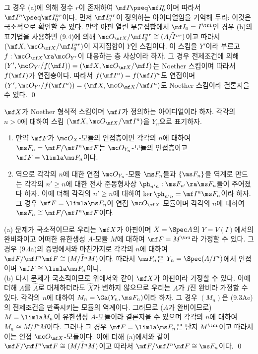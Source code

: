\begin{proposition}
	그 경우 (a)에 의해 정수 $r$이 존재하여 $\mf I\pseq\mf I_0^r$이며 따라서 $\mf I^n\pseq\mf I_0^{nr}$이다.
	먼저 $\mf I_0^{nr}$이 정의하는 아이디얼임을 기억해 두라: 이것은 국소적으로 확인할 수 있다.
	만약 아핀 열린 부분집합에서 $\mf I_0=I^\tri$인 경우 (b)의 표기법을 사용하면
	(9.4)에 의해 $\mc O_{\mf X}/\mf I_0^{nr}\cong\tilde{(A/I^{nr})}$이고
	따라서 $(\mf X,\mc O_{\mf X}/\mf I_0^{nr})$이 지지집합이 $Y$인 스킴이다.
	이 스킴을 $Y'$이라 부르고 $f:\mc O_{\mf X}\ra\mc O_{Y'}$이 대응하는 층 사상이라 하자.
	그 경우 전제조건에 의해 $(Y',\mc O_{Y'}/f(\mf I))=(\mf X,\mc O_{\mf X}/\mf I)$는 Noether 스킴이며 따라서 $f(\mf I)$가 연접층이다.
	따라서 $f(\mf I^n)=f(\mf I)^n$도 연접이며
	$(Y',\mc O_{Y'}/f(\mf I^n))=(\mf X,\mc O_{\mf X}/\mf I^n)$도 Noether 스킴이라 결론지을 수 있다.
	\qed
	\end{proposition}
	
	
	\begin{proposition}
	$\mf X$가 Noether 형식적 스킴이며 $\mf I$가 정의하는 아이디얼이라 하자.
	각각의 $n>0$에 대하여 스킴 $(\mf X,\mc O_{\mf X}/\mf I^n)$을 $Y_n$으로 표기하자.
	\begin{enumerate}[label=(\alph*)]
	\item 만약 $\mf F$가 $\mc O_X$-모듈의 연접층이면 각각의 $n$에 대하여 $\ms F_n=\mf F/\mf I^n\mf F$는
	$\mc O_{Y_n}$-모듈의 연접층이고 $\mf F=\limla\ms F_n$이다.
	\item 역으로 각각의 $n$에 대한 연접 $\mc O_{Y_n}$-모듈 $\ms F_n$들과
	$\{\ms F_n\}$을 역계로 만드는 각각의 $n'\ge n$에 대한 전사 준동형사상 $\ph_{n'n}:\ms F_{n'}\ra\ms F_n$들이 주어졌다 하자.
	이에 더해 각각의 $n'\ge n$에 대하여 $\ker\ph_{n'n}=\mf I^n\ms F_n$이라 하자.
	그 경우 $\mf F=\limla\ms F_n$이 연접 $\mc O_{\mf X}$-모듈이며 각각의 $n$에 대하여 $\ms F_n\cong\mf F/\mf I^n\mf F$이다.\\
	\end{enumerate}
	\pf (a) 문제가 국소적이므로 우리는 $\mf X$가 아핀이며 $X=\Spec A$의 $Y=V(I)$에서의 완비화이고
	어떠한 유한생성 $A$-모듈 $M$에 대하여 $\mf F=M^\tri$라 가정할 수 있다.
	그 경우 (9.4a)의 증명에서와 마찬가지로 각각의 $n$에 대하여 $\mf F/\mf I^n\mf F\cong\tilde{(M/I^nM)}$이다.
	따라서 $\ms F_n$은 $Y_n=\Spec(A/I^n)$에서 연접이며 $\mf F\cong\limla\ms F_n$이다.\\
	(b) 다시 문제가 국소적이므로 위에서와 같이 $\mf X$가 아핀이라 가정할 수 있다.
	이에 더해 $A$를 $\hat A$로 대체하더라도 $\hat X$가 변하지 않으므로 우리는 $A$가 $I$진 완비라 가정할 수 있다.
	각각의 $n$에 대하여 $M_n=\Ga(Y_n,\ms F_n)$이라 하자. 그 경우 $(M_n)$은 (9.3Ae)의 전제조건을 만족시키는 모듈의 역계이다.
	그러므로 ($A$가 완비이므로) $M=\limla M_n$이 유한생성 $A$-모듈이라 결론지을 수 있으며
	각각의 $n$에 대하여 $M_n\cong M/I^nM$이다.
	그러나 그 경우 $\mf F=\limla\ms F_n$은 단지 $M^\tri$이고 따라서 이는 연접 $\mc O_{\mf X}$-모듈이다.
	이에 더해 (a)에서와 같이 $\mf F/\mf I^n\mf F\cong\tilde{(M/I^nM)}$이고 따라서 $\mf F/\mf I^n\mf F\cong\ms F_n$이다.
	\qed
	\end{proposition}
	
